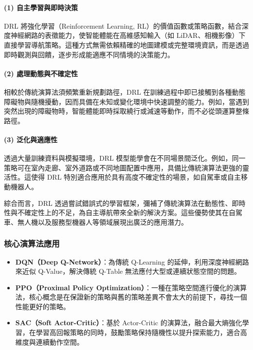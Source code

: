 \documentclass[12pt,a4paper]{ctexart}
\begin{document}
\paragraph{(1) 自主學習與即時決策}
DRL 將強化學習（Reinforcement Learning, RL）的價值函數或策略函數，結合深度神經網路的表徵能力，使智能體能在高維感知輸入（如 LiDAR、相機影像）下直接學習導航策略。這種方式無需依賴精確的地圖建模或完整環境資訊，而是透過即時觀測與回饋，逐步形成能適應不同情境的決策能力。

\paragraph{(2) 處理動態與不確定性}
相較於傳統演算法須頻繁重新規劃路徑，DRL 在訓練過程中即已接觸到各種動態障礙物與隨機擾動，因而具備在未知或變化環境中快速調整的能力。例如，當遇到突然出現的障礙物時，智能體能即時採取繞行或減速等動作，而不必從頭運算整條路徑。

\paragraph{(3) 泛化與適應性}
透過大量訓練資料與模擬環境，DRL 模型能學會在不同場景間泛化。例如，同一策略可在室內走廊、室外道路或不同地圖配置中應用，具備比傳統演算法更強的靈活性。這使得 DRL 特別適合應用於具有高度不確定性的場景，如自駕車或自主移動機器人。

\noindent 綜合而言，DRL 透過嘗試錯誤式的學習框架，彌補了傳統演算法在動態性、即時性與不確定性上的不足，為自主導航帶來全新的解決方案。這些優勢使其在自駕車、無人機以及服務型機器人等領域展現出廣泛的應用潛力。

\subsubsection{核心演算法應用}
\begin{itemize}
  \item \textbf{DQN（Deep Q-Network）}：為傳統 Q-Learning 的延伸，利用深度神經網路來近似 Q-Value，解決傳統 Q-Table 無法應付大型或連續狀態空間的問題。
  \item \textbf{PPO（Proximal Policy Optimization）}：一種在策略空間進行優化的演算法，核心概念是在保證新的策略與舊的策略差異不會太大的前提下，尋找一個性能更好的策略。
  \item \textbf{SAC（Soft Actor-Critic）}：基於 Actor-Critic 的演算法，融合最大熵強化學習，在學習高回報策略的同時，鼓勵策略保持隨機性以提升探索能力，適合高維度與連續動作空間。
\end{itemize}
\end{document}
